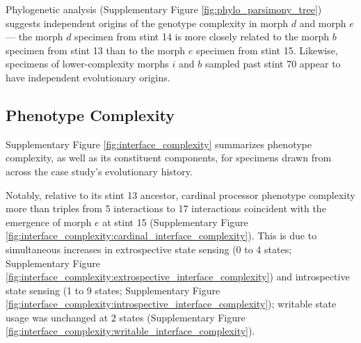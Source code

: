 Phylogenetic analysis (Supplementary Figure \ref{fig:phylo_parsimony_tree}) suggests independent origins of the genotype complexity in morph $d$ and morph $e$ --- the morph $d$ specimen from stint 14 is more closely related to the morph $b$ specimen from stint 13 than to the morph $e$ specimen from stint 15.
Likewise, specimens of lower-complexity morphs $i$ and $b$ sampled past stint 70 appear to have independent evolutionary origins.




\subsection{Phenotype Complexity}

Supplementary Figure \ref{fig:interface_complexity} summarizes phenotype complexity, as well as its constituent components, for specimens drawn from across the case study's evolutionary history.

Notably, relative to its stint 13 ancestor, cardinal processor phenotype complexity more than triples from 5 interactions to 17 interactions coincident with the emergence of morph $e$ at stint 15 (Supplementary Figure \ref{fig:interface_complexity:cardinal_interface_complexity}).
This is due to simultaneous increases in extrospective state sensing (0 to 4 states; Supplementary Figure \ref{fig:interface_complexity:extrospective_interface_complexity}) and introspective state sensing (1 to 9 states; Supplementary Figure \ref{fig:interface_complexity:introspective_interface_complexity}); writable state usage was unchanged at 2 states (Supplementary Figure \ref{fig:interface_complexity:writable_interface_complexity}).

